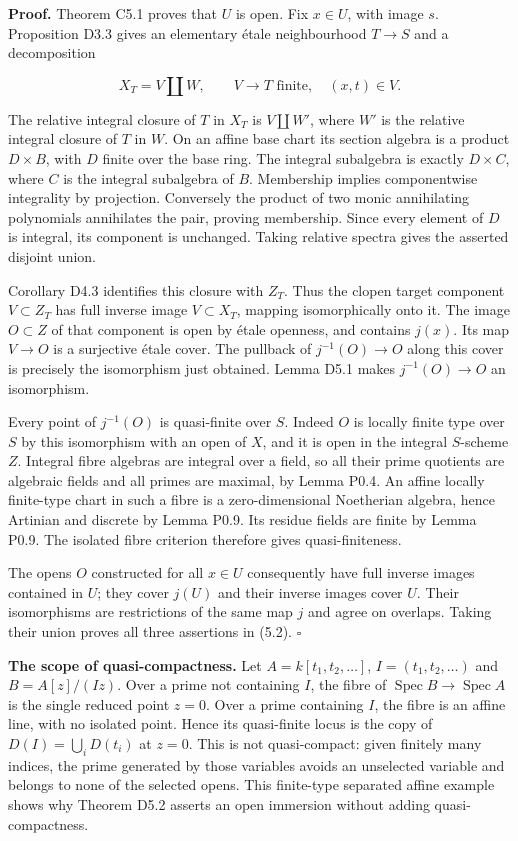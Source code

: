 \documentclass[11pt,a4paper,openany]{report}
\newcounter{none}
\begin{document}
\textbf{Proof.} Theorem C5.1 proves that \(U\) is open. Fix \(x\in U\), with image \(s\). Proposition D3.3 gives an elementary étale neighbourhood \(T\to S\) and a decomposition

\[
X_T=V\amalg W,\qquad V\to T\text{ finite},\quad (x,t)\in V.
\]

The relative integral closure of \(T\) in \(X_T\) is \(V\amalg W'\), where \(W'\) is the relative integral closure of \(T\) in \(W\). On an affine base chart its section algebra is a product \(D\times B\), with \(D\) finite over the base ring. The integral subalgebra is exactly \(D\times C\), where \(C\) is the integral subalgebra of \(B\). Membership implies componentwise integrality by projection. Conversely the product of two monic annihilating polynomials annihilates the pair, proving membership. Since every element of \(D\) is integral, its component is unchanged. Taking relative spectra gives the asserted disjoint union.

Corollary D4.3 identifies this closure with \(Z_T\). Thus the clopen target component \(V\subset Z_T\) has full inverse image \(V\subset X_T\), mapping isomorphically onto it. The image \(O\subset Z\) of that component is open by étale openness, and contains \(j(x)\). Its map \(V\to O\) is a surjective étale cover. The pullback of \(j^{-1}(O)\to O\) along this cover is precisely the isomorphism just obtained. Lemma D5.1 makes \(j^{-1}(O)\to O\) an isomorphism.

Every point of \(j^{-1}(O)\) is quasi-finite over \(S\). Indeed \(O\) is locally finite type over \(S\) by this isomorphism with an open of \(X\), and it is open in the integral \(S\)-scheme \(Z\). Integral fibre algebras are integral over a field, so all their prime quotients are algebraic fields and all primes are maximal, by Lemma P0.4. An affine locally finite-type chart in such a fibre is a zero-dimensional Noetherian algebra, hence Artinian and discrete by Lemma P0.9. Its residue fields are finite by Lemma P0.9. The isolated fibre criterion therefore gives quasi-finiteness.

The opens \(O\) constructed for all \(x\in U\) consequently have full inverse images contained in \(U\); they cover \(j(U)\) and their inverse images cover \(U\). Their isomorphisms are restrictions of the same map \(j\) and agree on overlaps. Taking their union proves all three assertions in (5.2). \(\square\)

\textbf{The scope of quasi-compactness.} Let \(A=k[t_1,t_2,\ldots]\), \(I=(t_1,t_2,\ldots)\) and \(B=A[z]/(Iz)\). Over a prime not containing \(I\), the fibre of \(\operatorname{Spec}B\to\operatorname{Spec}A\) is the single reduced point \(z=0\). Over a prime containing \(I\), the fibre is an affine line, with no isolated point. Hence its quasi-finite locus is the copy of \(D(I)=\bigcup_iD(t_i)\) at \(z=0\). This is not quasi-compact: given finitely many indices, the prime generated by those variables avoids an unselected variable and belongs to none of the selected opens. This finite-type separated affine example shows why Theorem D5.2 asserts an open immersion without adding quasi-compactness.
\end{document}
